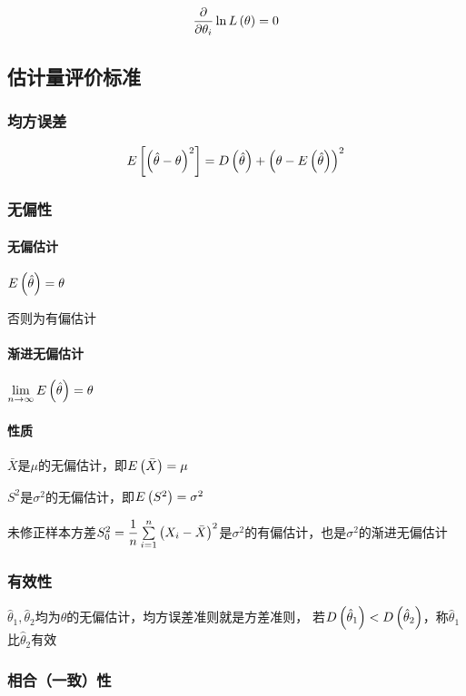 \documentclass{article}
\begin{document}
\[\frac\partial{\partial\theta_i}\ln L\left(\theta\right)=0\]

\subsection{估计量评价标准}

\subsubsection{均方误差}

\[E\left[\left(\hat\theta-\theta\right)^2\right]=D\left(\hat\theta\right)+{\left(\theta-E\left(\hat\theta\right)\right)}^2\]

\subsubsection{无偏性}

\paragraph{无偏估计}$E\left(\hat\theta\right)=\theta$

否则为有偏估计

\paragraph{渐进无偏估计}$\lim\limits_{n\to\infty}E\left(\hat\theta\right)=\theta$

\paragraph{性质}

$\bar X$是$\mu$的无偏估计，即$E\left(\bar X\right)=\mu$

$S^2$是$\sigma^2$的无偏估计，即$E\left(S^2\right)=\sigma^2$

未修正样本方差$S_0^2=\dfrac1n\sum\limits_{i=1}^n{\left(X_i-\bar X\right)}^2$是$\sigma^2$的有偏估计，也是$\sigma^2$的渐进无偏估计

\subsubsection{有效性}

$\hat\theta_1,\hat\theta_2$均为$\theta$的无偏估计，均方误差准则就是方差准则，
若$D\left(\hat\theta_1\right)<D\left(\hat\theta_2\right)$，称$\hat\theta_1$比$\hat\theta_2$有效

\subsubsection{相合（一致）性}
\end{document}
